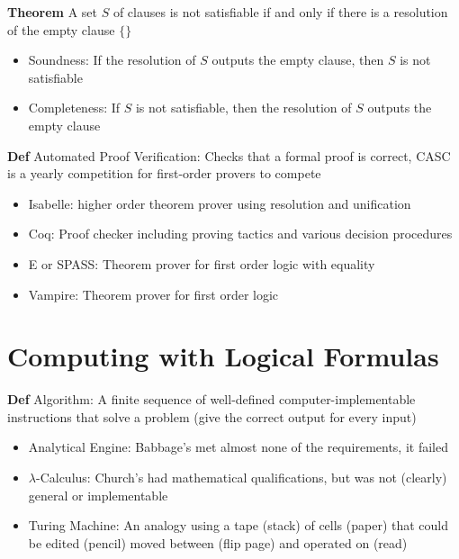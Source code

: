 \documentclass[11pt,notitlepage]{report}
\newcommand{\tbf}[1]{\textbf{#1}}
\begin{document}
\tbf{Theorem} A set $S$ of clauses is not satisfiable if and only if there is a resolution of the empty clause $\{\}$
\vspace{-3mm}
\begin{itemize}
    \item Soundness: If the resolution of $S$ outputs the empty clause, then $S$ is not satisfiable
    \item Completeness: If $S$ is not satisfiable, then the resolution of $S$ outputs the empty clause
\end{itemize}

\tbf{Def} Automated Proof Verification: Checks that a formal proof is correct, CASC is a yearly competition for first-order provers to compete
\vspace{-3mm}
\begin{itemize}
    \item Isabelle: higher order theorem prover using resolution and unification
    \item Coq: Proof checker including proving tactics and various decision procedures
    \item E or SPASS: Theorem prover for first order logic with equality
    \item Vampire: Theorem prover for first order logic
\end{itemize}


\newpage
\section{Computing with Logical Formulas}

\tbf{Def} Algorithm: A finite sequence of well-defined computer-implementable instructions that solve a problem (give the correct output for every input)
\vspace{-2mm}
\begin{itemize}
    \item Analytical Engine: Babbage's met almost none of the requirements, it failed
    \item $\lambda$-Calculus: Church's had mathematical qualifications, but was not (clearly) general or implementable
    \item Turing Machine: An analogy using a tape (stack) of cells (paper) that could be edited (pencil) moved between (flip page) and operated on (read)
\end{itemize}
\end{document}

